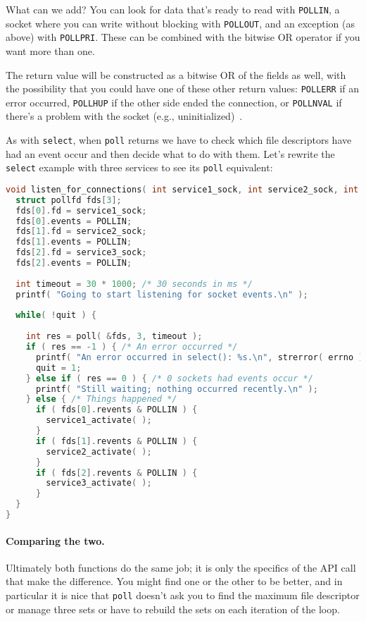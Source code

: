 What can we add? You can look for data that's ready to read with \texttt{POLLIN}, a socket where you can write without blocking with \texttt{POLLOUT}, and an exception (as above) with \texttt{POLLPRI}. These can be combined with the bitwise OR operator if you want more than one. 

The return value will be constructed as a bitwise OR of the fields as well, with the possibility that you could have one of these other return values: \texttt{POLLERR} if an error occurred, \texttt{POLLHUP} if the other side ended the connection, or \texttt{POLLNVAL} if there's a problem with the socket (e.g., uninitialized)~\cite{getaddrinfo}.

As with \texttt{select}, when \texttt{poll} returns we have to check which file descriptors have had an event occur and then decide what to do with them. Let's rewrite the \texttt{select} example with three services to see its \texttt{poll} equivalent:

\begin{lstlisting}[language=C]
void listen_for_connections( int service1_sock, int service2_sock, int service3_sock ) {
  struct pollfd fds[3];
  fds[0].fd = service1_sock;
  fds[0].events = POLLIN;
  fds[1].fd = service2_sock;
  fds[1].events = POLLIN;
  fds[2].fd = service3_sock;
  fds[2].events = POLLIN;
 
  int timeout = 30 * 1000; /* 30 seconds in ms */ 
  printf( "Going to start listening for socket events.\n" );
  
  while( !quit ) {
    
    int res = poll( &fds, 3, timeout );
    if ( res == -1 ) { /* An error occurred */
      printf( "An error occurred in select(): %s.\n", strerror( errno ) );
      quit = 1;
    } else if ( res == 0 ) { /* 0 sockets had events occur */
      printf( "Still waiting; nothing occurred recently.\n" );
    } else { /* Things happened */
      if ( fds[0].revents & POLLIN ) {
        service1_activate( ); 
      }
      if ( fds[1].revents & POLLIN ) {
        service2_activate( ); 
      }
      if ( fds[2].revents & POLLIN ) {
        service3_activate( ); 
      }
  }
}
\end{lstlisting}


\paragraph{Comparing the two.}
Ultimately both functions do the same job; it is only the specifics of the API call that make the difference. You might find one or the other to be better, and in particular it is nice that \texttt{poll} doesn't ask you to find the maximum file descriptor or manage three sets or have to rebuild the sets on each iteration of the loop.

